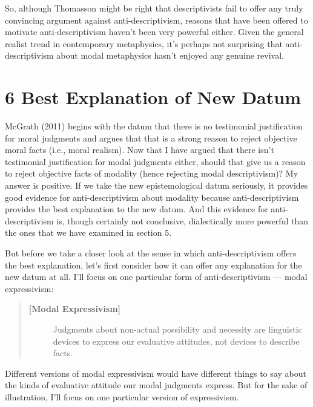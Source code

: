 \documentclass[a4paper,12pt]{article}
\begin{document}

So, although Thomasson might be right that descriptivists fail to offer any truly convincing argument against anti-descriptivism, reasons that have been offered to motivate anti-descriptivism haven't been very powerful either. Given the general realist trend in contemporary metaphysics, it's perhaps not surprising that anti-descriptivism about modal metaphysics hasn't enjoyed any genuine revival.

\section*{6 Best Explanation of New Datum}

McGrath (2011) begins with the datum that there is no testimonial justification for moral judgments and argues that that is a strong reason to reject objective moral facts (i.e., moral realism). Now that I have argued that there isn't testimonial justification for modal judgments either, should that give us a reason to reject objective facts of modality (hence rejecting modal descriptivism)? My answer is positive. If we take the new epistemological datum seriously, it provides good evidence for anti-descriptivism about modality because anti-descriptivism provides the best explanation to the new datum. And this evidence for anti-descriptivism is, though certainly not conclusive, dialectically more powerful than the ones that we have examined in section 5.

But before we take a closer look at the sense in which anti-descriptivism offers the best explanation, let's first consider how it can offer any explanation for the new datum at all. I'll focus on one particular form of anti-descriptivism --- modal expressivism:

\begin{quote}
\begin{description}
\item[\textbf{[Modal Expressivism]}] Judgments about non-actual possibility and necessity are linguistic devices to express our evaluative attitudes, not devices to describe facts.
\end{description}
\end{quote}

Different versions of modal expressivism would have different things to say about the kinds of evaluative attitude our modal judgments express. But for the sake of illustration, I'll focus on one particular version of expressivism.
\end{document}
